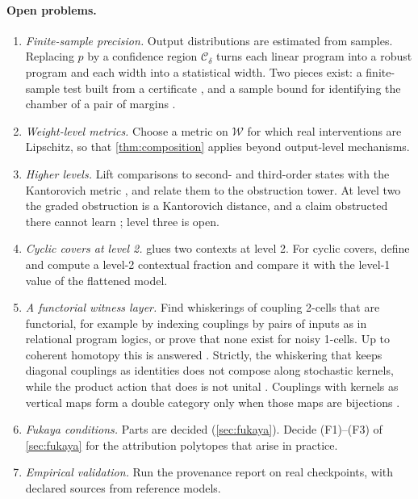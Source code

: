 \documentclass[11pt]{article}
\theoremstyle{definition}
\theoremstyle{remark}
\newcommand{\cW}{\mathcal{W}}
\begin{document}
\paragraph{Open problems.}
\begin{enumerate}[leftmargin=*]
\item \emph{Finite-sample precision.} Output distributions are estimated from samples. Replacing $p$ by
  a confidence region $\mathcal C_\delta$ turns each linear program into a robust program and each width
  into a statistical width. Two pieces exist: a finite-sample test built from a certificate
  \cite[Prop.~11.1]{Awasthi-Tower}, and a sample bound for identifying the chamber of a pair of margins
  \cite[Prop.~12.2]{Awasthi-Conditionals}.
\item \emph{Weight-level metrics.} Choose a metric on $\cW$ for which real interventions are Lipschitz,
  so that \cref{thm:composition} applies beyond output-level mechanisms.
\item \emph{Higher levels.} Lift comparisons to second- and third-order states with the Kantorovich
  metric \cite{FritzPerrone2019}, and relate them to the obstruction tower. At level two the graded obstruction is a
  Kantorovich distance, and a claim obstructed there cannot learn \cite[Lemma~52.1, Cor.~52.3]{Awasthi-ThreeLayers}; level
  three is open.
\item \emph{Cyclic covers at level 2.}  glues two contexts at level 2. For cyclic
  covers, define and compute a level-2 contextual fraction and compare it with the level-1 value of
  the flattened model.
\item \emph{A functorial witness layer.} Find whiskerings of coupling 2-cells that are functorial, for
  example by indexing couplings by pairs of inputs as in relational program logics, or prove that none
  exist for noisy 1-cells. Up to coherent homotopy this is answered \cite[Thm.~5.2]{Awasthi-Conditionals}. Strictly, the
  whiskering that keeps diagonal couplings as identities does not compose along stochastic kernels, while the product
  action that does is not unital \cite[Thm.~10.2]{Awasthi-Conditionals}. Couplings with kernels as vertical maps form a double category only when
  those maps are bijections \cite{Awasthi-Algebras}.
\item \emph{Fukaya conditions.} Parts are decided (\cref{sec:fukaya}). Decide (F1)--(F3) of \cref{sec:fukaya} for the attribution polytopes
  that arise in practice.
\item \emph{Empirical validation.} Run the provenance report on real checkpoints, with declared sources
  from reference models.
\end{enumerate}
\end{document}
